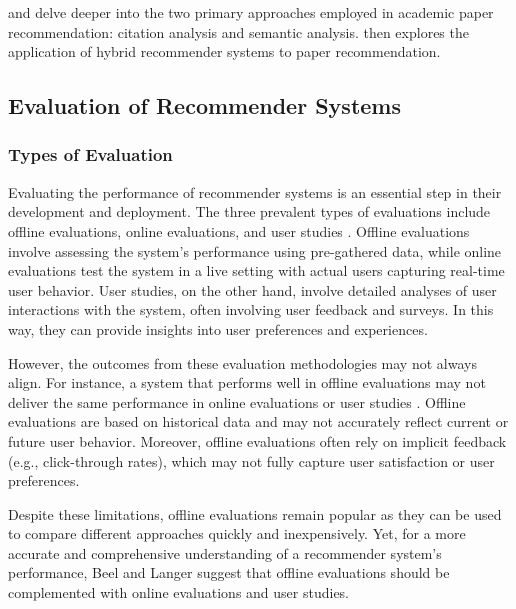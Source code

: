  and  delve deeper into the two primary approaches employed in academic paper recommendation: citation analysis and semantic analysis.  then explores the application of hybrid recommender systems to paper recommendation.


\subsection{Evaluation of Recommender Systems} \label{sec:evaluation-of-recommender-systems}

\subsubsection*{Types of Evaluation}

Evaluating the performance of recommender systems is an essential step in their development and deployment. The three prevalent types of evaluations include offline evaluations, online evaluations, and user studies \cite{BeelComparisonOffline2015}. Offline evaluations involve assessing the system's performance using pre-gathered data, while online evaluations test the system in a live setting with actual users capturing real-time user behavior.
User studies, on the other hand, involve detailed analyses of user interactions with the system, often involving user feedback and surveys. In this way, they can provide insights into user preferences and experiences.

However, the outcomes from these evaluation methodologies may not always align. For instance, a system that performs well in offline evaluations may not deliver the same performance in online evaluations or user studies \cite{BeelComparisonOffline2015}. Offline evaluations are based on historical data and may not accurately reflect current or future user behavior. Moreover, offline evaluations often rely on implicit feedback (e.g., click-through rates), which may not fully capture user satisfaction or user preferences.

Despite these limitations, offline evaluations remain popular as they can be used to compare different approaches quickly and inexpensively.
Yet, for a more accurate and comprehensive understanding of a recommender system's performance, Beel and Langer \cite{BeelComparisonOffline2015} suggest that offline evaluations should be complemented with online evaluations and user studies.

